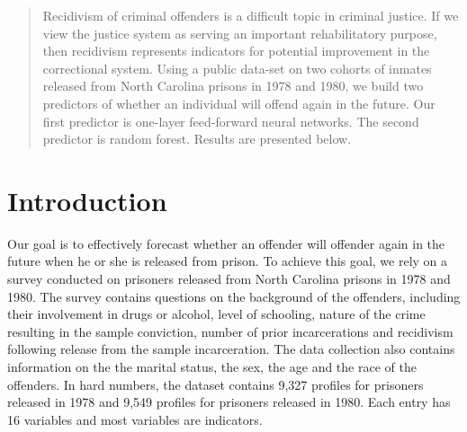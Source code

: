 \documentclass[a0,landscape]{a0poster}
\begin{document}
\begin{multicols}{4} %


\color{Navy} %

\begin{abstract}

Recidivism of criminal offenders is a difficult topic in criminal justice. If we view the justice system as serving an important rehabilitatory purpose, then recidivism represents indicators for potential improvement in the correctional system. Using a public data-set on two cohorts of inmates released from North Carolina prisons in 1978 and 1980, we build two predictors of whether an individual will offend again in the future. Our first predictor is one-layer feed-forward neural networks. The second predictor is random forest. Results are presented below.

\end{abstract}


\color{SaddleBrown} %

\section*{Introduction}

Our goal is to effectively forecast whether an offender will offender again in the future when he or she is released from prison. To achieve this goal, we rely on a survey conducted on prisoners released from North Carolina prisons in 1978 and 1980. The survey contains questions on the background of the offenders, including their involvement in drugs or alcohol, level of schooling, nature of the crime resulting in the sample conviction, number of prior incarcerations and recidivism following release from the sample
incarceration. The data collection also contains information on the
the marital status, the sex, the age and the race of the offenders. In hard numbers, the dataset contains 9,327 profiles for prisoners released in 1978 and 9,549 profiles for prisoners released in 1980. Each entry has 16 variables and most variables are indicators.


\end{multicols}
\end{document}
